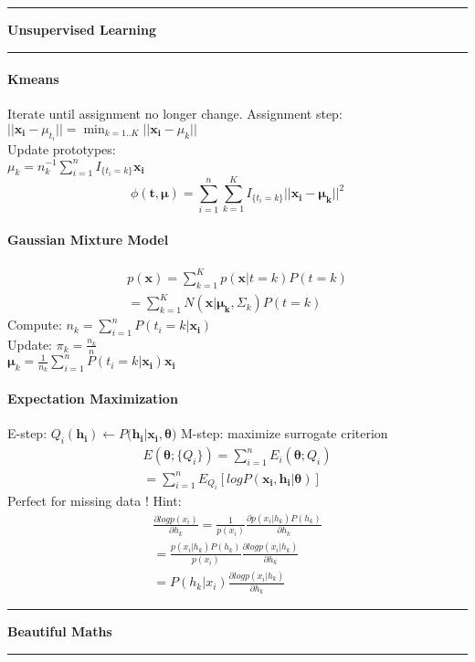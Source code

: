 \documentclass[7pt]{scrartcl}
\newlength{\secskip}
\renewcommand{\section}[1]{
  \vspace{\secskip}
  \hrule\vspace{.3em}
  \textbf{#1}
  \vspace{.3em}
  \hrule
  \vspace{\secskip}
}
\renewcommand{\vec}{\mathbf}
\begin{document}
\begin{multicols}{4}
\section{Unsupervised Learning}
\paragraph{Kmeans}
Iterate until assignment no longer change. Assignment step: \\
$||\vec{x_i} - \mu_{t_i}|| = \min_{k=1..K} || \vec{x_i} - \mu_{k}||$\\
Update prototypes:\\$\mu_k = n_k^{-1} \sum_{i=1}^n I_{\{t_i=k\}}\vec{x_i}$
\[\phi(\vec{t,\mu}) = \sum_{i=1}^n\sum_{k=1}^K I_{\{t_i=k\}} || \vec{x_i} - \vec{\mu_k} || ^2\]
\paragraph{Gaussian Mixture Model}
\begin{align*}
p(\vec{x}) = \sum_{k=1}^K p(\vec{x}|t=k) P(t=k) \\
=  \sum_{k=1}^K N(\vec{x}|\vec{\mu_k},\Sigma_k)P(t=k)
\end{align*}
Compute: $n_k = \sum_{i=1}^nP(t_i=k|\vec{x_i})$\\Update: $\pi_k = \frac{n_k}{n}$\\
$\vec{\mu}_k = \frac{1}{n_k}\sum_{i=1}^nP(t_i=k|\vec{x_i})\vec{x_i}$

\paragraph{Expectation Maximization}
E-step: $Q_i(\vec{h_i}) \leftarrow P(\vec{h_i}|\vec{x_i},\vec{\theta)}$
M-step: maximize surrogate criterion
\begin{align*}
E(\vec{\theta};\{Q_i\}) = \sum_{i=1}^n E_i(\vec{\theta};Q_i) \\= \sum_{i=1}^n E_{Q_i} [logP(\vec{x_i},\vec{h_i}|\vec{\theta})]
\end{align*}
Perfect for missing data !
Hint:
\begin{align*}
\frac{\partial logp(x_i)}{\partial h_k} = \frac{1}{p(x_i)}\frac{\partial p(x_i|h_k)P(h_k)}{\partial h_k} \\
= \frac{p(x_i|h_k)P(h_k)}{p(x_i)}\frac{\partial logp(x_i|h_k)}{\partial h_k} \\
= P(h_k|x_i) \frac{\partial logp(x_i|h_k)}{\partial h_k}
\end{align*}
\section{Beautiful Maths} 

\end{multicols}
\end{document}
